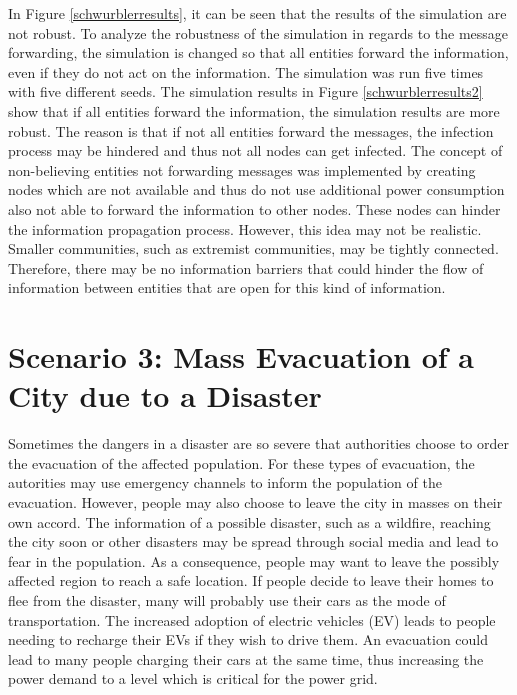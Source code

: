 In Figure \ref{schwurblerresults}, it can be seen that 
the results of the simulation are not robust. To analyze the 
robustness of the simulation in regards to the message 
forwarding, the simulation is changed so that all entities
forward the information, even if they do not act on the information. 
The simulation was run five times with five different seeds. 
The simulation results in Figure \ref{schwurblerresults2} show 
that if all entities forward 
the information, the simulation results are more robust. 
The reason is that if not all entities forward the messages,
the infection process may be hindered and thus not
all nodes can get infected. The concept of non-believing entities
not forwarding messages
was implemented by creating nodes which are not available and thus
do not use additional power consumption
also not able to forward the information to other nodes.
These nodes can hinder the information propagation process.
However, this idea may not be realistic. Smaller communities,
such as extremist communities, may 
be tightly connected. Therefore, there may be no information 
barriers that could hinder the flow of information between 
entities that are open for this kind of information.


\section{Scenario 3: Mass Evacuation of a City due to a Disaster}
\label{scenario3all}

Sometimes the dangers in a disaster are so severe that 
authorities choose to order the evacuation of the affected population.
For these types of evacuation, the autorities may use emergency channels 
to inform the population of the evacuation.
However, people may also choose to leave the city in masses on their own accord.
The information of a possible disaster, such as a wildfire, reaching the
city soon or other disasters may be spread through social media and 
lead to fear in the population. As a consequence, people may 
want to leave the possibly affected region to reach a safe location.
If people decide to leave their homes to flee from the disaster, many
will probably use their cars as the mode of transportation.
The increased adoption of electric vehicles (EV)
leads to people needing to recharge their EVs if they wish 
to drive them. An evacuation could lead to many people charging
their cars at the same time, thus increasing the power demand 
to a level which is critical for the power grid. 

